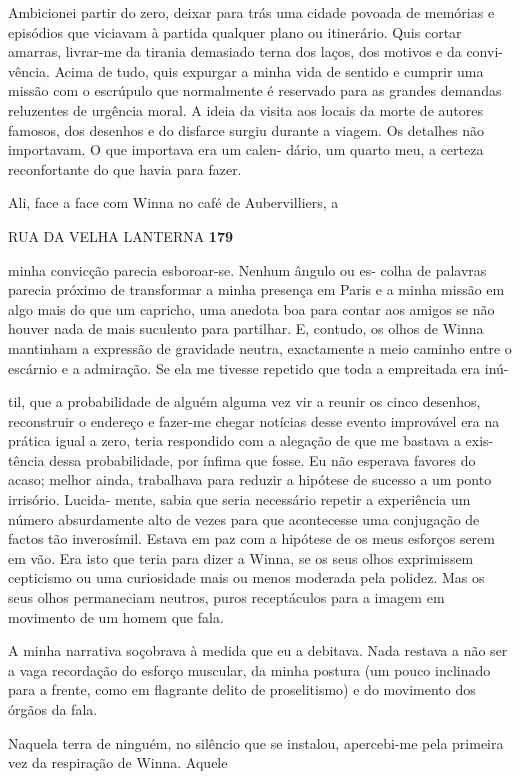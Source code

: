 Ambicionei partir do zero, deixar para trás uma cidade povoada de
memórias e episódios que viciavam à partida qualquer plano ou
itinerário. Quis cortar amarras, livrar-me da tirania demasiado terna
dos laços, dos motivos e da convi- vência. Acima de tudo, quis expurgar
a minha vida de sentido e cumprir uma missão com o escrúpulo que
normalmente é reservado para as grandes demandas reluzentes de urgência
moral. A ideia da visita aos locais da morte de autores famosos, dos
desenhos e do disfarce surgiu durante a viagem. Os detalhes não
importavam. O que importava era um calen- dário, um quarto meu, a
certeza reconfortante do que havia para fazer.

Ali, face a face com Winna no café de Aubervilliers, a

RUA DA VELHA LANTERNA \textbf{179}

minha convicção parecia esboroar-se. Nenhum ângulo ou es- colha de
palavras parecia próximo de transformar a minha presença em Paris e a
minha missão em algo mais do que um capricho, uma anedota boa para
contar aos amigos se não houver nada de mais suculento para partilhar.
E, contudo, os olhos de Winna mantinham a expressão de gravidade neutra,
exactamente a meio caminho entre o escárnio e a admiração. Se ela me
tivesse repetido que toda a empreitada era inú-

til, que a probabilidade de alguém alguma vez vir a reunir os cinco
desenhos, reconstruir o endereço e fazer-me chegar notícias desse evento
improvável era na prática igual a zero, teria respondido com a alegação
de que me bastava a exis- tência dessa probabilidade, por ínfima que
fosse. Eu não esperava favores do acaso; melhor ainda, trabalhava para
reduzir a hipótese de sucesso a um ponto irrisório. Lucida- mente, sabia
que seria necessário repetir a experiência um número absurdamente alto
de vezes para que acontecesse uma conjugação de factos tão inverosímil.
Estava em paz com a hipótese de os meus esforços serem em vão. Era isto
que teria para dizer a Winna, se os seus olhos exprimissem cepticismo ou
uma curiosidade mais ou menos moderada pela polidez. Mas os seus olhos
permaneciam neutros, puros receptáculos para a imagem em movimento de um
homem que fala.

A minha narrativa soçobrava à medida que eu a debitava. Nada restava a
não ser a vaga recordação do esforço muscular, da minha postura (um
pouco inclinado para a frente, como em flagrante delito de proselitismo)
e do movimento dos órgãos da fala.

Naquela terra de ninguém, no silêncio que se instalou, apercebi-me pela
primeira vez da respiração de Winna. Aquele

